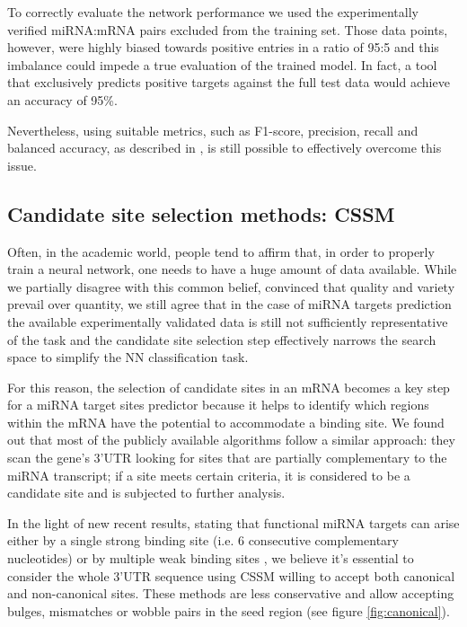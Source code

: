 To correctly evaluate the network performance we used the experimentally verified miRNA:mRNA pairs excluded from the training set. Those data points, however, were highly biased towards positive entries in a ratio of 95:5 and this imbalance could impede a true evaluation of the trained model. In fact, a tool that exclusively predicts positive targets against the full test data would achieve an accuracy of 95\%. 

Nevertheless, using suitable metrics, such as F1-score, precision, recall and balanced accuracy, as described in \cite{imbalanced}, is still possible to effectively overcome this issue.

\subsection{Candidate site selection methods: CSSM}
Often, in the academic world, people tend to affirm that, in order to properly train a neural network, one needs to have a huge amount of data available. While we partially disagree with this common belief, convinced that quality and variety prevail over quantity, we still agree that in the case of miRNA targets prediction the available experimentally validated data is still not sufficiently representative of the task and the candidate site selection step effectively narrows the search space to simplify the NN classification task.

For this reason, the selection of candidate sites in an mRNA becomes a key step for a miRNA target sites predictor because it helps to identify which regions within the mRNA have the potential to accommodate a binding site. We found out that most of the publicly available algorithms follow a similar approach: they scan the gene's 3'UTR  looking for sites that are partially complementary to the miRNA transcript; if a site meets certain criteria, it is considered to be a candidate site and is subjected to further analysis.

In the light of new recent results, stating that functional miRNA targets can arise either by a single strong binding site (i.e. 6 consecutive complementary nucleotides) or by multiple weak binding sites \cite{helwak}, we believe it's essential to consider the whole 3'UTR sequence using CSSM willing to accept both canonical and non-canonical sites. These methods are less conservative and allow accepting bulges, mismatches or wobble pairs in the seed region (see figure \ref{fig:canonical}).

